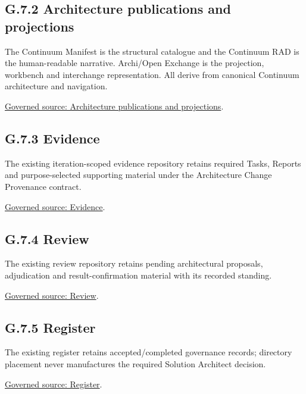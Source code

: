 \subsection*{G.7.2 Architecture publications and projections}
\label{navigation:G.7.2}

The Continuum Manifest is the structural catalogue and the Continuum RAD is the human-readable narrative. Archi/Open Exchange is the projection, workbench and interchange representation. All derive from canonical Continuum architecture and navigation.\par
\href{../../../../../../../../documentation/README.md}{Governed source: Architecture publications and projections}.\par
\subsection*{G.7.3 Evidence}
\label{navigation:G.7.3}

The existing iteration-scoped evidence repository retains required Tasks, Reports and purpose-selected supporting material under the Architecture Change Provenance contract.\par
\href{../../../../../..}{Governed source: Evidence}.\par
\subsection*{G.7.4 Review}
\label{navigation:G.7.4}

The existing review repository retains pending architectural proposals, adjudication and result-confirmation material with its recorded standing.\par
\href{../../../../../../../review}{Governed source: Review}.\par
\subsection*{G.7.5 Register}
\label{navigation:G.7.5}

The existing register retains accepted/completed governance records; directory placement never manufactures the required Solution Architect decision.\par
\href{../../../../../../../register}{Governed source: Register}.\par
